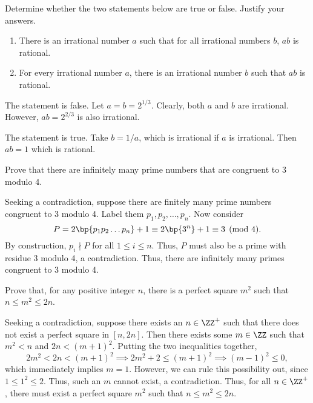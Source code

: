 \begin{problem}
    Determine whether the two statements below are true or false. Justify your answers.

    \begin{enumerate}
        \item There is an irrational number $a$ such that for all irrational numbers $b$, $ab$ is rational.
        \item For every irrational number $a$, there is an irrational number $b$ such that $ab$ is rational.
    \end{enumerate}
\end{problem}
\begin{solution}
    \begin{ppart}
        The statement is false. Let $a = b = 2^{1/3}$. Clearly, both $a$ and $b$ are irrational. However, $ab = 2^{2/3}$ is also irrational.
    \end{ppart}
    \begin{ppart}
        The statement is true. Take $b = 1/a$, which is irrational if $a$ is irrational. Then $ab = 1$ which is rational.
    \end{ppart}
\end{solution}

\begin{problem}
    Prove that there are infinitely many prime numbers that are congruent to 3 modulo 4.
\end{problem}
\begin{solution}
    Seeking a contradiction, suppose there are finitely many prime numbers congruent to 3 modulo 4. Label them $p_1, p_2, \dots, p_n$. Now consider \[P = 2\bp{p_1p_2\dots p_n} + 1 \equiv 2\bp{3^n} + 1 \equiv 3 \pmod{4}.\] By construction, $p_i \nmid P$ for all $1 \leq i \leq n$. Thus, $P$ must also be a prime with residue 3 modulo 4, a contradiction. Thus, there are infinitely many primes congruent to 3 modulo 4.
\end{solution}

\begin{problem}
    Prove that, for any positive integer $n$, there is a perfect square $m^2$ such that $n \leq m^2 \leq 2n$.
\end{problem}
\begin{solution}
    Seeking a contradiction, suppose there exists an $n \in \ZZ^+$ such that there does not exist a perfect square in $[n, 2n]$. Then there exists some $m \in \ZZ$ such that $m^2 < n$ and $2n < (m+1)^2$. Putting the two inequalities together, \[2m^2 < 2n < (m+1)^2 \implies 2m^2 + 2\leq (m+1)^2 \implies (m-1)^2 \leq 0,\] which immediately implies $m = 1$. However, we can rule this possibility out, since $1 \leq 1^2 \leq 2$. Thus, such an $m$ cannot exist, a contradiction. Thus, for all $n \in \ZZ^+$, there must exist a perfect square $m^2$ such that $n \leq m^2 \leq 2n$.
\end{solution}

